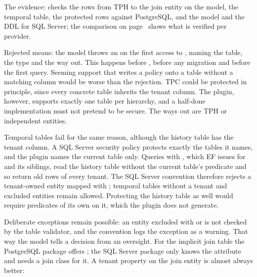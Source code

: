 The evidence:  checks the rows from TPH to the
join entity on the model,
 the
temporal table,
 the protected rows against PostgreSQL, and
 the model and
the DDL for SQL Server; the comparison on page~\pageref{sec:provider-comparison} shows what is
verified per provider.

Rejected means: the model throws an 
on the first access to , naming the table, the type and the way out. This happens
before , before any migration and before the first query.
Seeming support that writes a policy onto a table without a matching column would be worse than
the rejection. TPC could be protected in principle, since every concrete table inherits the
tenant column. The plugin, however, supports exactly one table per hierarchy, and a half-done
implementation must not pretend to be secure. The ways out are TPH or independent entities.

Temporal tables fail for the same reason, although the history table has the tenant column. A
SQL Server security policy protects exactly the tables it names, and the plugin names the current
table only. Queries with , which EF issues for
 and its siblings, read the history table without
the current table's predicate and so return old rows of every tenant. The SQL Server convention
therefore rejects a tenant-owned entity mapped with ;
temporal tables without a tenant and excluded entities remain allowed. Protecting the history
table as well would require predicates of its own on it, which the plugin does not generate.

Deliberate exceptions remain possible: an entity excluded with
 or
is not checked by the table validator, and the convention logs the exception as a warning. That way the model tells a
decision from an oversight. For the implicit join table the PostgreSQL package offers
;
the SQL Server package only knows the attribute and needs a join class for it. A tenant property
on the join entity is almost always better:

